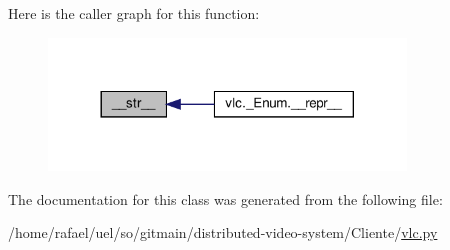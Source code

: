 Here is the caller graph for this function\+:
\nopagebreak
\begin{figure}[H]
\begin{center}
\leavevmode
\includegraphics[width=269pt]{classvlc_1_1___cstruct_a23e8041ce1015febe4fdace3225714f9_icgraph}
\end{center}
\end{figure}


The documentation for this class was generated from the following file\+:\begin{DoxyCompactItemize}
\item 
/home/rafael/uel/so/gitmain/distributed-\/video-\/system/\+Cliente/\hyperlink{vlc_8py}{vlc.\+py}\end{DoxyCompactItemize}
